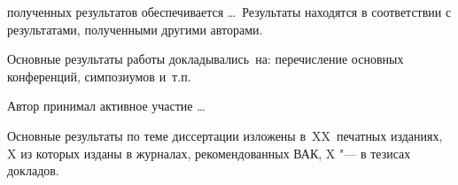
{\reliability} полученных результатов обеспечивается \ldots \ Результаты находятся в соответствии с результатами, полученными другими авторами.

{\probation}
Основные результаты работы докладывались~на: перечисление основных конференций, симпозиумов и~т.\:п.

{\contribution} Автор принимал активное участие \ldots

{%
    {\publications} Основные результаты по теме диссертации изложены
    в~XX~печатных изданиях,
    X из которых изданы в журналах, рекомендованных ВАК,
    X "--- в тезисах докладов.
}%
